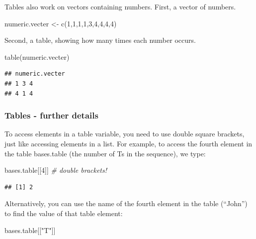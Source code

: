 \documentclass[
]{book}
\newenvironment{Shaded}{\begin{snugshade}}{\end{snugshade}}
\newcommand{\CommentTok}[1]{\textcolor[rgb]{0.56,0.35,0.01}{\textit{#1}}}
\newcommand{\DecValTok}[1]{\textcolor[rgb]{0.00,0.00,0.81}{#1}}
\newcommand{\FunctionTok}[1]{\textcolor[rgb]{0.00,0.00,0.00}{#1}}
\newcommand{\NormalTok}[1]{#1}
\newcommand{\OtherTok}[1]{\textcolor[rgb]{0.56,0.35,0.01}{#1}}
\newcommand{\StringTok}[1]{\textcolor[rgb]{0.31,0.60,0.02}{#1}}
\begin{document}
Tables also work on vectors containing numbers. First, a vector of numbers.

\begin{Shaded}
\begin{Highlighting}[]
\NormalTok{numeric.vecter }\OtherTok{\textless{}{-}} \FunctionTok{c}\NormalTok{(}\DecValTok{1}\NormalTok{,}\DecValTok{1}\NormalTok{,}\DecValTok{1}\NormalTok{,}\DecValTok{1}\NormalTok{,}\DecValTok{3}\NormalTok{,}\DecValTok{4}\NormalTok{,}\DecValTok{4}\NormalTok{,}\DecValTok{4}\NormalTok{,}\DecValTok{4}\NormalTok{)}
\end{Highlighting}
\end{Shaded}

Second, a table, showing how many times each number occurs.

\begin{Shaded}
\begin{Highlighting}[]
\FunctionTok{table}\NormalTok{(numeric.vecter)}
\end{Highlighting}
\end{Shaded}

\begin{verbatim}
## numeric.vecter
## 1 3 4 
## 4 1 4
\end{verbatim}

\hypertarget{tables---further-details}{%
\subsubsection{Tables - further details}\label{tables---further-details}}

To access elements in a table variable, you need to use double square brackets, just like accessing elements in a list. For example, to access the fourth element in the table bases.table (the number of Ts in the sequence), we type:

\begin{Shaded}
\begin{Highlighting}[]
\NormalTok{bases.table[[}\DecValTok{4}\NormalTok{]]  }\CommentTok{\# double brackets!}
\end{Highlighting}
\end{Shaded}

\begin{verbatim}
## [1] 2
\end{verbatim}

Alternatively, you can use the name of the fourth element in the table (``John'') to find the value of that table element:

\begin{Shaded}
\begin{Highlighting}[]
\NormalTok{bases.table[[}\StringTok{"T"}\NormalTok{]]}
\end{Highlighting}
\end{Shaded}
\end{document}
